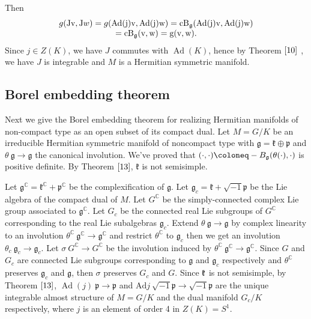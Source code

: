 Then
\[
\begin{array}{c}
	g(\mathrm{Jv}, \mathrm{J} w)=g(\mathrm{Ad}(\mathrm{j})
	\mathrm{v}, \operatorname{Ad}(\mathrm{j})
	\mathrm{w})=\mathrm{cB}_{{\mathfrak g}}(\mathrm{Ad}(\mathrm{j})
	\mathrm{v}, \mathrm{Ad}(\mathrm{j}) \mathrm{w}) \\
	=\mathrm{cB}_{{\mathfrak g}}(\mathrm{v},
	\mathrm{w})=\mathrm{g}(\mathrm{v}, \mathrm{w}) .
\end{array}
\]
Since $j \in Z(K)$, we have $J$ commutes with
$\operatorname{Ad}(K)$, hence by Theorem $\ref{10}$ , we have $J$
is integrable and $M$ is a Hermitian symmetric manifold.
\eproof
\subsection{Borel embedding theorem}

Next we give the Borel embedding theorem for realizing Hermitian
manifolds
of non-compact type as an open subset of its compact dual. Let
$M=G / K$ be an irreducible Hermitian symmetric manifold of
noncompact type with
$\mathfrak{g}=\mathfrak{k}\oplus\mathfrak{p}$ and $\theta\:
\mathfrak{g} \rightarrow \mathfrak{g}$ the canonical involution.
We've proved that $(\cdot, \cdot)\coloneq -B_{\ssg}(\theta(\cdot),
\cdot)$ is positive definite. By Theorem $\ref{13}$,
$\mathfrak{k}$ is not semisimple.



Let $\mathfrak{g}^{\mathbb{C}}=\mathfrak{k}^{\mathbb{C}}+
\mathfrak{p}^{\mathbb{C}}$ be the complexification of $\mathfrak{g}$. Let
$\mathfrak{g}_{c}=\mathfrak{k}+\sqrt{-1} \mathfrak{p}$ be the Lie
algebra of the compact dual of $M$. Let $G^{\mathbb{C}}$ be the
simply-connected complex Lie group associated to
$\mathfrak{g}^{\mathbb{C}}$. Let $G_{c}$ be the connected real
Lie subgroups of
$G^{\mathbb{C}}$ corresponding to the real Lie subalgebras
$\mathfrak{g}_{c}$. Extend $\theta\: \mathfrak{g} \rightarrow
\mathfrak{g}$ by complex linearity to an involution
$\theta^{\mathbb{C}}\: \mathfrak{g}^{\mathbb{C}} \rightarrow
\mathfrak{g}^{\mathbb{C}}$ and
restrict $\theta^{\mathbb{C}}$ to $\mathfrak{g}_{c}$ then we get
an involution $\theta_{c}\: \mathfrak{g}_{c} \rightarrow
\mathfrak{g}_{c} .$ Let $\sigma\: G^{\mathbb{C}} \rightarrow
G^{\mathbb{C}}$
be the involution induced by $\theta^{\mathbb{C}}\:
\mathfrak{g}^{\mathbb{C}} \rightarrow \mathfrak{g}^{\mathbb{C}}$.
Since $G$ and $G_{c}$ are connected Lie subgroups corresponding
to $\mathfrak{g}$ and $\mathfrak{g}_{c}$ respectively and
$\theta^{\mathbb{C}}$ preserves $\mathfrak{g}_{c}$ and
$\mathfrak{g}$, then $\sigma$ preserves $G_{c}$ and $G$. Since
${\mathfrak k}$ is not semisimple, by Theorem $\ref{13}$,
$\operatorname{Ad}(j)\: \mathfrak{p} \rightarrow \mathfrak{p}$ and
$\mathrm{Ad} j\: \sqrt{-1} \mathfrak{p} \rightarrow \sqrt{-1}
\mathfrak{p}$
are the unique integrable almost structure of $M=G / K$ and the
dual manifold $G_{c} / K$ respectively, where $j$ is an element
of order 4 in $Z(K)=S^{1}$.


